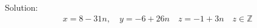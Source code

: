 Solution: 
\begin{align*}
x = 8 - 31n,
\quad
y = -6 + 26n
\quad
z = -1 + 3n
\quad
z \in \mathbb{Z}
\end{align*}
